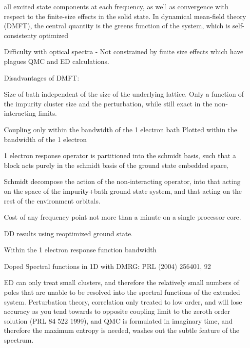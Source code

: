 \documentclass[aps,showpacs,twocolumn,nobibnotes]{revtex4}
\begin{document}
all excited state components at each frequency, as well as 
convergence with respect to the finite-size effects in the solid state. In dynamical mean-field theory (DMFT), the central quantity 
is the greens function of the system, which is self-consistenty optimized 

Difficulty with optical spectra - 
Not constrained by finite size effects which have plagues QMC and ED calculations.

Disadvantages of DMFT:

Size of bath independent of the size of the underlying lattice. Only a function of the impurity cluster size and the perturbation, while still exact in the non-interacting limits.

Coupling only within the bandwidth of the 1 electron bath
Plotted within the bandwidth of the 1 electron 

1 electron response operator is partitioned into the schmidt basis, such that a block acts purely in the schmidt basis of the ground state embedded space, 

Schmidt decompose the action of the non-interacting operator, into that acting on the space of the impurity+bath ground state system, and that acting on the rest of the environment orbitals.

Cost of any frequency point not more than a minute on a single processor core.

DD results using reoptimized ground state.

Within the 1 electron response function bandwidth

Doped Spectral functions in 1D with DMRG: PRL (2004) 256401, 92

ED can only treat small clusters, and therefore the relatively small numbers of poles that are unable to be resolved into the spectral functions of the extended system. Perturbation theory, 
correlation only treated to low order, and will 
lose accuracy as you tend towards to opposite coupling limit to the zeroth order solution (PRL 84 522 1999), and QMC is formulated in imaginary time, and therefore the maximum entropy is needed,
washes out the subtle feature of the spectrum.


%
\end{document}
